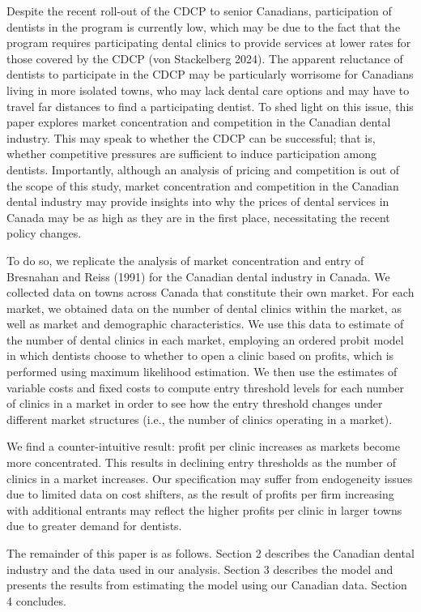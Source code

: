 \documentclass[a4paper,11pt]{article}
\begin{document}
Despite the recent roll-out of the CDCP to senior Canadians, participation of dentists in the program is currently low, which may be due to the fact that the program requires participating dental clinics to provide services at lower rates for those covered by the CDCP (von Stackelberg 2024). The apparent reluctance of dentists to participate in the CDCP may be particularly worrisome for Canadians living in more isolated towns, who may lack dental care options and may have to travel far distances to find a participating dentist. To shed light on this issue, this paper explores market concentration and competition in the Canadian dental industry. This may speak to whether the CDCP can be successful; that is, whether competitive pressures are sufficient to induce participation among dentists. Importantly, although an analysis of pricing and competition is out of the scope of this study, market concentration and competition in the Canadian dental industry may provide insights into why the prices of dental services in Canada may be as high as they are in the first place, necessitating the recent policy changes.

To do so, we replicate the analysis of market concentration and entry of Bresnahan and Reiss (1991) for the Canadian dental industry in Canada. We collected data on towns across Canada that constitute their own market. For each market, we obtained data on the number of dental clinics within the market, as well as market and demographic characteristics. We use this data to estimate of the number of dental clinics in each market, employing an ordered probit model in which dentists choose to whether to open a clinic based on profits, which is performed using maximum likelihood estimation. We then use the estimates of variable costs and fixed costs to compute entry threshold levels for each number of clinics in a market in order to see how the entry threshold changes under different market structures (i.e., the number of clinics operating in a market).

We find a counter-intuitive result: profit per clinic increases as markets become more concentrated. This results in declining entry thresholds as the number of clinics in a market increases. Our specification may suffer from endogeneity issues due to limited data on cost shifters, as the result of profits per firm increasing with additional entrants may reflect the higher profits per clinic in larger towns due to greater demand for dentists.

The remainder of this paper is as follows. Section 2 describes the Canadian dental industry and the data used in our analysis. Section 3 describes the model and presents the results from estimating the model using our Canadian data. Section 4 concludes.
\end{document}

